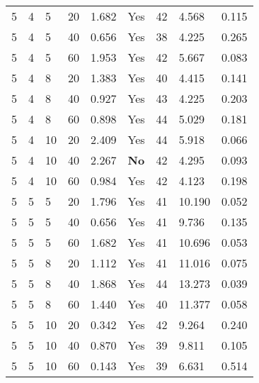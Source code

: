 \begin{longtable}{x{1.5cm} x{1.8cm} x{1.8cm} x{1.5cm} x{1.8cm} x{1.5cm} x{1.5cm} x{1.5cm} x{1.8cm}}
	5 & 4 & 5 & 20 & 1.682 & Yes & 42 & 4.568 & 0.115 \\
	5 & 4 & 5 & 40 & 0.656 & Yes & 38 & 4.225 & 0.265 \\
	5 & 4 & 5 & 60 & 1.953 & Yes & 42 & 5.667 & 0.083 \\
	5 & 4 & 8 & 20 & 1.383 & Yes & 40 & 4.415 & 0.141 \\
	5 & 4 & 8 & 40 & 0.927 & Yes & 43 & 4.225 & 0.203 \\
	5 & 4 & 8 & 60 & 0.898 & Yes & 44 & 5.029 & 0.181 \\
	5 & 4 & 10 & 20 & 2.409 & Yes & 44 & 5.918 & 0.066 \\
	5 & 4 & 10 & 40 & 2.267 & \textbf{No} & 42 & 4.295 & 0.093 \\
	5 & 4 & 10 & 60 & 0.984 & Yes & 42 & 4.123 & 0.198 \\
	5 & 5 & 5 & 20 & 1.796 & Yes & 41 & 10.190 & 0.052 \\
	5 & 5 & 5 & 40 & 0.656 & Yes & 41 & 9.736 & 0.135 \\
	5 & 5 & 5 & 60 & 1.682 & Yes & 41 & 10.696 & 0.053 \\
	5 & 5 & 8 & 20 & 1.112 & Yes & 41 & 11.016 & 0.075 \\
	5 & 5 & 8 & 40 & 1.868 & Yes & 44 & 13.273 & 0.039 \\
	5 & 5 & 8 & 60 & 1.440 & Yes & 40 & 11.377 & 0.058 \\
	5 & 5 & 10 & 20 & 0.342 & Yes & 42 & 9.264 & 0.240 \\
	5 & 5 & 10 & 40 & 0.870 & Yes & 39 & 9.811 & 0.105 \\
	5 & 5 & 10 & 60 & 0.143 & Yes & 39 & 6.631 & 0.514\label{tab:calibration} \\
\end{longtable}
\setlength{\arrayrulewidth}{1pt}
\renewcommand{\arraystretch}{1}